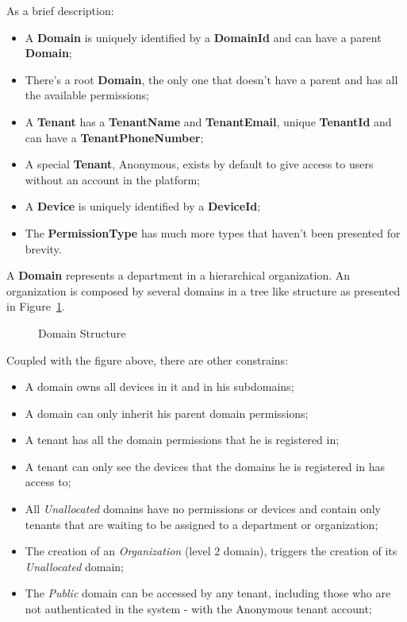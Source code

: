 As a brief description:

\begin{itemize}
   \item A \textbf{Domain} is uniquely identified by a \textbf{DomainId} and can have a parent \textbf{Domain};
   \item There's a root \textbf{Domain}, the only one that doesn't have a parent and has all the available permissions;
   \item A \textbf{Tenant} has a \textbf{TenantName} and \textbf{TenantEmail}, unique \textbf{TenantId} and can have a \textbf{TenantPhoneNumber};
   \item A special \textbf{Tenant}, Anonymous, exists by default to give access to users without an account in the platform;
   \item A \textbf{Device} is uniquely identified by a \textbf{DeviceId};
   \item The \textbf{PermissionType} has much more types that haven't been presented for brevity.
\end{itemize}

A \textbf{Domain} represents a department in a hierarchical organization. An organization is composed by several domains in a tree like structure as presented in Figure~\ref{fig:design:domain:bounded_contexts:identity:organization}.

\begin{figure}[H]
   \centering
  \resizebox{\columnwidth}{!}
  {
     
  }
  \caption[Domain Structure]{Domain Structure}
  \label{fig:design:domain:bounded_contexts:identity:organization}
\end{figure}

Coupled with the figure above, there are other constrains:

\begin{itemize}
   \item A domain owns all devices in it and in his subdomains;
   \item A domain can only inherit his parent domain permissions;
   \item A tenant has all the domain permissions that he is registered in;
   \item A tenant can only see the devices that the domains he is registered in has access to;
   \item All \textit{Unallocated} domains have no permissions or devices and contain only tenants that are waiting to be assigned to a department or organization;
   \item The creation of an \textit{Organization} (level 2 domain), triggers the creation of its \textit{Unallocated} domain;
   \item The \textit{Public} domain can be accessed by any tenant, including those who are not authenticated in the system - with the Anonymous tenant account;
\end{itemize}

